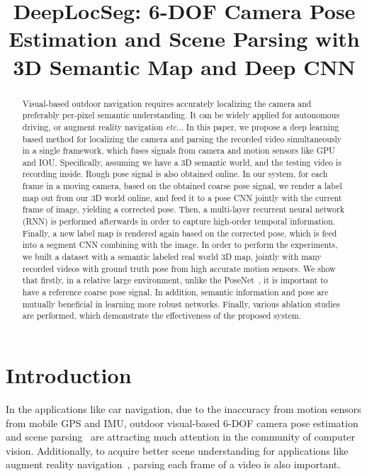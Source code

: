 \documentclass[10pt,twocolumn,letterpaper]{article}
\makeatletter
\DeclareRobustCommand\onedot{\futurelet\@let@token\@onedot}
\def\onedot{\ifx\@let@token.\else.\null\fi\xspace}
\def\eg{\emph{e.g.}}
\def\etc{\emph{etc}\onedot}
\makeatother
\begin{document}
\title{DeepLocSeg: 6-DOF Camera Pose Estimation and Scene Parsing with 3D Semantic Map and Deep CNN}

\maketitle

\begin{abstract}
Visual-based outdoor navigation requires accurately localizing the camera and preferably per-pixel semantic understanding. It can be widely applied for autonomous driving, or augment reality navigation \etc.
In this paper, we propose a deep learning based method for localizing the camera and parsing the recorded video simultaneously in a single framework, which fuses signals from camera and motion sensors like GPU and IOU.
Specifically, assuming we have a 3D semantic world, and the testing video is recording inside. Rough pose signal is also obtained online. In our system, for each frame in a moving camera, based on the obtained coarse pose signal, we render a label map out from our 3D world online, and feed it to a pose CNN jointly with the current frame of image, yielding a corrected pose. 
Then, a multi-layer recurrent neural network (RNN) is performed afterwards in order to capture high-order temporal information. 
Finally, a new label map is rendered again based on the corrected pose, which is feed into a segment CNN combining with the image.
In order to perform the experiments,  we built a dataset with a semantic labeled real world 3D map, jointly with many recorded videos with ground truth pose from high accurate motion sensors. We show that firstly, in a relative large environment, unlike the PoseNet~\cite{}, it is important to have a reference coarse pose signal. In addition, semantic information and pose are mutually beneficial in learning more robust networks. Finally, various ablation studies are performed, which demonstrate the effectiveness of the proposed system.
\end{abstract}

\section{Introduction}
\label{sec:introduction}
In the applications like car navigation, due to the inaccuracy from motion sensors from mobile GPS and IMU, outdoor visual-based 6-DOF camera pose estimation and scene parsing~\cite{} are attracting much attention in the community of computer vision. 
Additionally, to acquire better scene understanding for applications like augment reality navigation~\cite{}, parsing each frame of a video is also important.
\end{document}
